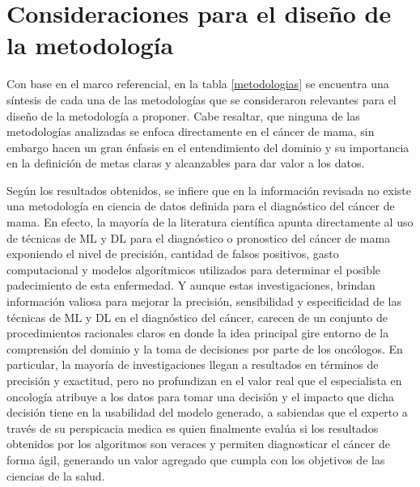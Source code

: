 \chapter{Consideraciones para el diseño de la metodología}
Con base en el marco referencial, en la tabla \ref{metodologias} se encuentra una síntesis de cada una de las  metodologías que se consideraron relevantes para el diseño de la metodología a proponer. Cabe resaltar, que ninguna de las metodologías analizadas se enfoca directamente en el cáncer de mama, sin embargo hacen un gran énfasis en el entendimiento del dominio y su importancia en la definición de metas claras y alcanzables para dar valor a los datos. 

Según los resultados obtenidos, se infiere que en la información revisada no existe una metodología en ciencia de datos definida para el diagnóstico del cáncer de mama.  En efecto, la mayoría de la literatura científica apunta directamente al uso de técnicas de ML y DL para el diagnóstico o pronostico del cáncer de mama exponiendo el nivel de precisión, cantidad de falsos positivos, gasto computacional y modelos algorítmicos utilizados para determinar el posible padecimiento de esta enfermedad. Y aunque estas investigaciones, brindan información valiosa para mejorar la precisión, sensibilidad y especificidad de las técnicas de ML y DL en el diagnóstico del cáncer, carecen de un conjunto de procedimientos racionales claros en donde la idea principal gire entorno de la comprensión del dominio y la toma de decisiones por parte de los oncólogos. En particular, la mayoría de investigaciones llegan a resultados en términos de precisión y exactitud, pero no profundizan en el valor real que el especialista en oncología atribuye a los datos para tomar una decisión y el impacto que dicha decisión tiene en la usabilidad del modelo generado, a sabiendas que el experto a través de su perspicacia medica es quien finalmente evalúa si los resultados obtenidos por los algoritmos son veraces y permiten diagnosticar el cáncer de forma ágil, generando un valor agregado que cumpla con los objetivos de las ciencias de la salud. 

